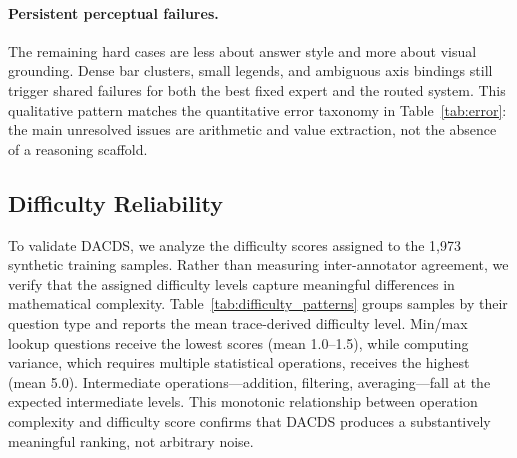 \documentclass[journal]{IEEEtran}
\newcommand{\dacds}{DACDS}
\begin{document}
\paragraph{Persistent perceptual failures.}
The remaining hard cases are less about answer style and more about visual grounding.
Dense bar clusters, small legends, and ambiguous axis bindings still trigger shared failures for both the best fixed expert and the routed system.
This qualitative pattern matches the quantitative error taxonomy in Table~\ref{tab:error}: the main unresolved issues are arithmetic and value extraction, not the absence of a reasoning scaffold.

\subsection{Difficulty Reliability}

To validate \dacds{}, we analyze the difficulty scores assigned to the 1,973 synthetic training samples.
Rather than measuring inter-annotator agreement, we verify that the assigned difficulty levels capture meaningful differences in mathematical complexity.
Table~\ref{tab:difficulty_patterns} groups samples by their question type and reports the mean trace-derived difficulty level.
Min/max lookup questions receive the lowest scores (mean 1.0--1.5), while computing variance, which requires multiple statistical operations, receives the highest (mean 5.0).
Intermediate operations---addition, filtering, averaging---fall at the expected intermediate levels.
This monotonic relationship between operation complexity and difficulty score confirms that \dacds{} produces a substantively meaningful ranking, not arbitrary noise.
\end{document}
